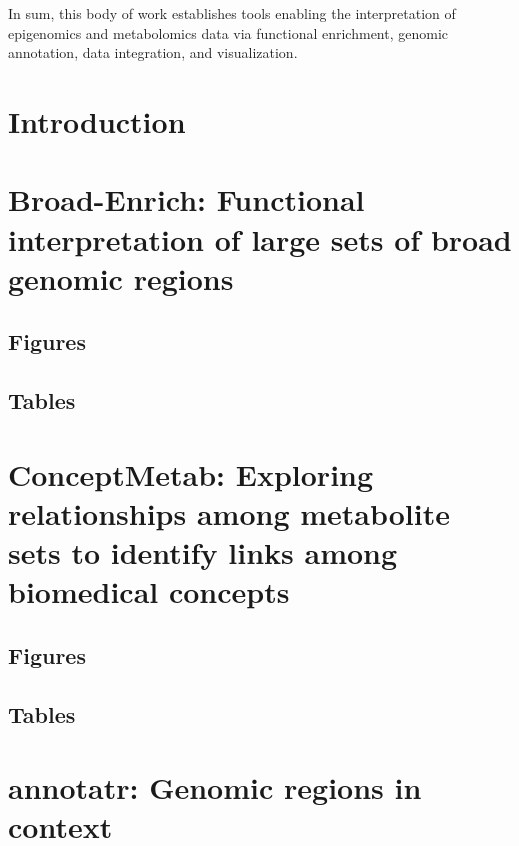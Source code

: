\documentclass[leqno]{report}
\theoremstyle{plain}
\theoremstyle{definition}
\theoremstyle{remark}
\numberwithin{theorem}{chapter}        %
\begin{document}
{In sum, this body of work establishes tools enabling the interpretation of epigenomics and metabolomics data via functional enrichment, genomic annotation, data integration, and visualization.
}

\startthechapters

\setcounter{page}{1}

\chapter{Introduction}
\label{introduction}


\chapter{Broad-Enrich: Functional interpretation of large sets of broad genomic regions}
\label{chap2}

\clearpage
\section*{Figures}

\clearpage
\section*{Tables}


\chapter{ConceptMetab: Exploring relationships among metabolite sets to identify links among biomedical concepts}
\label{chap3}

\clearpage
\section*{Figures}

\clearpage
\section*{Tables}


\chapter{annotatr: Genomic regions in context}
\label{chap4}

\clearpage
\end{document}
